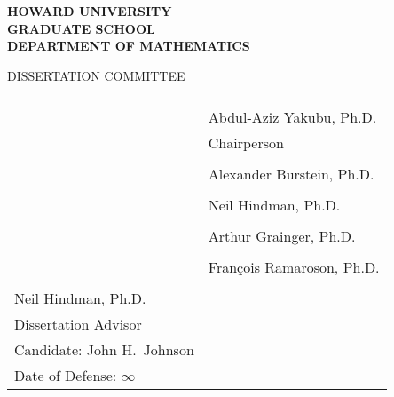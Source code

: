 \newcommand{\approval}{
  \clearpage
  \begin{center}
    \textbf{HOWARD UNIVERSITY} \\
    \textbf{GRADUATE SCHOOL} \\
    \textbf{DEPARTMENT OF MATHEMATICS} \\ \vspace{1em}
    
    DISSERTATION COMMITTEE
  \end{center}

  \newcommand{\sigline}{\makebox[3in]{\hrulefill}}

  \vspace{4em}
  
  \begin{tabular}{@{}l @{}l}
    \hspace{15em} & \sigline \\
    \hspace{15em} & Abdul-Aziz Yakubu, Ph.D. \\
    \hspace{15em} & Chairperson \vspace{4em} \\
    \hspace{15em} & \sigline \\
    \hspace{15em} & Alexander Burstein, Ph.D.  \vspace{4em} \\
    \hspace{15em} & \sigline \\
    \hspace{15em} & Neil Hindman, Ph.D.  \vspace{4em} \\
    \hspace{15em} & \sigline \\
    \hspace{15em} & Arthur Grainger, Ph.D. \vspace{4em} \\
    \hspace{15em} & \sigline \\
    \hspace{15em} & Fran\c{c}ois Ramaroson, Ph.D. \vspace{4em} \\
    
    \sigline & \\
    Neil Hindman, Ph.D. & \\
    Dissertation Advisor & \vspace{2em} \\

    Candidate: John H.~Johnson & \vspace{2em} \\
    Date of Defense: $\infty$
  \end{tabular}
  
  \vfill
}

\thetitlepage
\approval